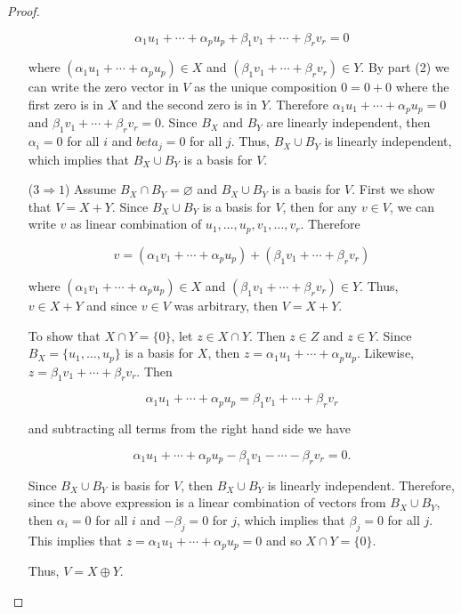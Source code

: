 \documentclass[12pt]{article}
\theoremstyle{definition}
\begin{document}
\begin{proof}
\begin{itemize}
\[\alpha_1 u_1 + \cdots + \alpha_p u_p + \beta_1 v_1 + \cdots + \beta_r v_r = 0\]

where $(\alpha_1 u_1 + \cdots + \alpha_p u_p) \in X$ and 
$(\beta_1 v_1 + \cdots + \beta_r v_r) \in Y$. By part (2) we can write the zero vector in $V$
as the unique composition $0 = 0 + 0$ where the first zero is in $X$ and the second zero is in
$Y$. Therefore $\alpha_1 u_1 + \cdots + \alpha_p u_p = 0$ and 
$\beta_1 v_1 + \cdots + \beta_r v_r = 0$.  Since $B_X$ and $B_Y$ are linearly independent, then
$\alpha_i = 0$ for all $i$ and $beta_j = 0$ for all $j$. Thus, $B_X \cup B_Y$ is linearly
independent, which implies that $B_X \cup B_Y$ is a basis for $V$.

\item[($3 \Rightarrow 1$)] Assume $B_X \cap B_Y = \varnothing$ and $B_X \cup B_Y$ is
a basis for $V$. First we show that $V = X + Y$. Since $B_X \cup B_Y$ is a basis for $V$,
then for any $v \in V$, we can write $v$ as linear combination of 
$u_1, \ldots, u_p, v_1, \ldots, v_r$. Therefore

\[v = (\alpha_1 v_1 + \cdots + \alpha_p u_p) + (\beta_1 v_1 + \cdots + \beta_r v_r) \]

where $(\alpha_1 v_1 + \cdots + \alpha_p u_p) \in X$ and
$(\beta_1 v_1 + \cdots + \beta_r v_r) \in Y$. Thus, $v \in X + Y$ and since $v \in V$
was arbitrary, then $V = X + Y$.

To show that $X \cap Y = \{0\}$, let $z \in X \cap Y$. Then $z \in Z$ and $z \in Y$. Since
$B_X = \{u_1, \ldots, u_p\}$ is a basis for $X$, then $z = \alpha_1 u_1 + \cdots + \alpha_p u_p$.
Likewise, $z = \beta_1 v_1 + \cdots + \beta_r v_r$. Then 

\[\alpha_1 u_1 + \cdots + \alpha_p u_p = \beta_1 v_1 + \cdots + \beta_r v_r\]

and subtracting all terms from the right hand side we have

\[\alpha_1 u_1 + \cdots + \alpha_p u_p - \beta_1 v_1 - \cdots - \beta_r v_r = 0.\]

Since $B_X \cup B_Y$ is basis for $V$, then $B_X \cup B_Y$ is linearly independent. Therefore,
since the above expression is a linear combination of vectors from $B_X \cup B_Y$, then
$\alpha_i = 0$ for all $i$ and $-\beta_j = 0$ for $j$, which implies that $\beta_j = 0$ for
all $j$. This implies that $z = \alpha_1 u_1 + \cdots + \alpha_p u_p = 0$ and so $X \cap Y = \{0\}$.

Thus, $V = X \oplus Y$.
\end{itemize}
\end{proof}
\end{document}
